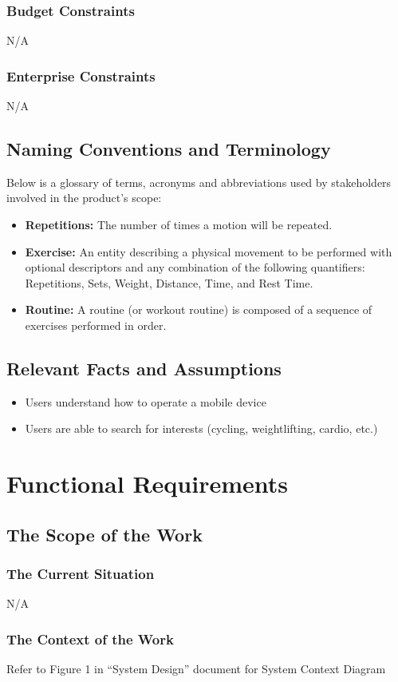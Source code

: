 \documentclass[12pt]{article}
\begin{document}
\subsubsection{Budget Constraints}
N/A
\subsubsection{Enterprise Constraints}
N/A

\subsection{Naming Conventions and Terminology}
Below is a glossary of terms, acronyms and abbreviations used by stakeholders involved in the product's scope:
\begin{itemize}
	\item \textbf{Repetitions: } The number of times a motion will be repeated.
	\item \textbf{Exercise: } An entity describing a physical movement to be performed with optional descriptors and any combination of the following quantifiers: Repetitions, Sets, Weight, Distance, Time, and Rest Time. 
	\item \textbf{Routine: } A routine (or workout routine) is composed of a sequence of exercises performed in order.
\end{itemize}
\subsection{Relevant Facts and Assumptions}
\begin{itemize}
	\item Users understand how to operate a mobile device
	\item Users are able to search for interests (cycling, weightlifting, cardio, etc.)
\end{itemize}
\section{Functional Requirements}
\subsection{The Scope of the Work}
\subsubsection{The Current Situation}
N/A
\subsubsection{The Context of the Work}
Refer to Figure 1 in ``System Design'' document for System Context Diagram
\end{document}
